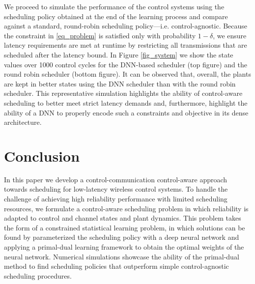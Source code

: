 \documentclass[conference,10pt]{IEEEtran}
\begin{document}
We proceed to simulate the performance of the control systems using the scheduling policy obtained at the end of the learning process and compare against a standard, round-robin scheduling policy---i.e. control-agnostic. Because the constraint in \eqref{eq_problem} is satisfied only with probability $1-\delta$, we ensure latency requirements are met at runtime by restricting all transmissions that are scheduled after the latency bound. In Figure \ref{fig_system} we show the state values over 1000 control cycles for the DNN-based scheduler (top figure) and the round robin scheduler (bottom figure). It can be observed that, overall, the plants are kept in better states using the DNN scheduler than with the round robin scheduler. This representative simulation highlights the ability of control-aware scheduling to better meet strict latency demands and, furthermore, highlight the ability of a DNN to properly encode such a constraints and objective in its dense architecture. 



 
 \section{Conclusion}
In this paper we develop a control-communication control-aware approach towards scheduling for low-latency wireless control systems. To handle the challenge of achieving high reliability performance with limited scheduling resources, we formulate a control-aware scheduling problem in which reliability is adapted to control and channel states and plant dynamics. This problem takes the form of a constrained statistical learning problem, in which solutions can be found by parameterized the scheduling policy with a deep neural network and applying a primal-dual learning framework to obtain the optimal weights of the neural network. Numerical simulations showcase the ability of the primal-dual method to find scheduling policies that outperform simple control-agnostic scheduling procedures.





\end{document}
